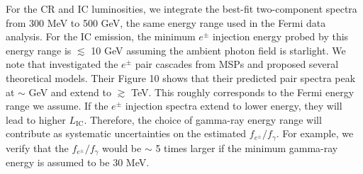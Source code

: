 \documentclass[doublespace,nopageskip]{VTthesis} %
\begin{document}
For the CR and IC luminosities, we integrate the best-fit two-component spectra from 300 MeV to 500 GeV, the same energy range used in the Fermi data analysis. For the IC emission, the minimum $e^\pm$ injection energy probed by this energy range is $\lesssim$ 10 GeV assuming the ambient photon field is starlight. We note that \citet{2011ApJ...743..181H} investigated the $e^\pm$ pair cascades from MSPs and proposed several theoretical models. Their Figure 10 shows that their predicted pair spectra peak at $\sim$ GeV and extend to $\gtrsim$ TeV. This roughly corresponds to the Fermi energy range we assume. If the $e^\pm$ injection spectra extend to lower energy, they will lead to higher $L_\mathrm{IC}$. Therefore, the choice of gamma-ray energy range will contribute as systematic uncertainties on the estimated $f_{e^\pm}/f_\gamma$. For example, we verify that the $f_{e^\pm}/f_\gamma$ would be $\sim$ 5 times larger if the minimum gamma-ray energy is assumed to be 30 MeV.
\end{document}
